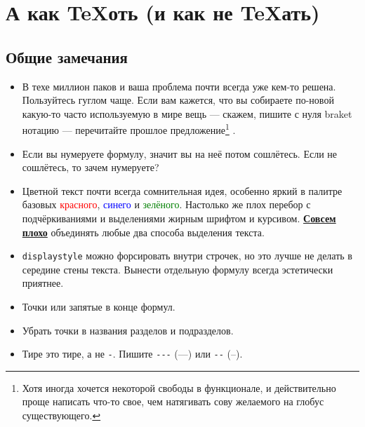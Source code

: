 \section*{А как \texorpdfstring{\TeX}{ТеХ}оть (и как не \texorpdfstring{\TeX}{ТеХ}ать)}



\subsection*{Общие замечания}


\begin{itemize}
\item В техе миллион паков и ваша проблема почти всегда уже кем-то решена. Пользуйтесь гуглом чаще. Если вам кажется, что вы собираете по-новой какую-то часто используемую в мире вещь — скажем, пишите с нуля braket нотацию — перечитайте прошлое предложение\footnote{
    Хотя иногда хочется некоторой свободы в функционале, и действительно проще написать что-то свое, чем натягивать сову желаемого на глобус существующего.
} .

\item Если вы нумеруете формулу, значит вы на неё потом сошлётесь. Если не сошлётесь, то зачем нумеруете?


\item Цветной текст почти всегда сомнительная идея, особенно яркий в палитре базовых \textcolor{red}{красного}, \textcolor{blue}{синего} и \textcolor{green}{зелёного}. Настолько же плох перебор с подчёркиваниями и выделениями жирным шрифтом и курсивом. \underline{\textbf{Совсем плохо}} объединять любые  два способа выделения текста.

\item \verb+displaystyle+ можно форсировать внутри строчек, но это лучше не делать в середине стены текста. Вынести отдельную формулу всегда эстетически приятнее.

\item Точки или запятые в конце формул.

\item Убрать точки в названия разделов и подразделов.

\item Тире это тире, а не \verb+-+. Пишите \verb+---+ (---) или \verb+--+ (--).
\end{itemize}



